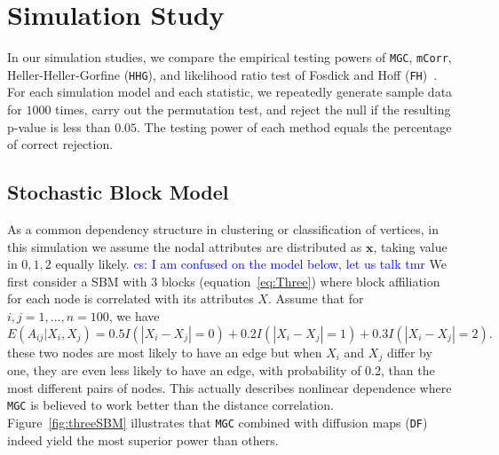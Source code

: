 \documentclass[11pt]{article}
\theoremstyle{definition}
\newcommand{\cs}[1]{\textcolor{blue}{cs: #1}}
\begin{document}
\section{Simulation Study}
\label{sec:simulation}
	\vspace*{-0.2cm}
In our simulation studies, we compare the empirical testing powers of \texttt{MGC}, \texttt{mCorr}, Heller-Heller-Gorfine (\texttt{HHG}), and likelihood ratio test of Fosdick and Hoff (\texttt{FH})~\citep{fosdick2015testing}. For each simulation model and each statistic, we repeatedly generate sample data for $1000$ times, carry out the permutation test, and reject the null if the resulting p-value is less than $0.05$. The testing power of each method equals the percentage of correct rejection. %

\subsection{Stochastic Block Model}

As a common dependency structure in clustering or classification of vertices, in this simulation we assume the nodal attributes are distributed as $\mathbf{x}$, taking value in $0,1,2$ equally likely.
\cs{I am confused on the model below, let us talk tmr}
We first consider a SBM with $3$ blocks (equation~\ref{eq:Three}) where block affiliation for each node is correlated with its attributes $X$. Assume that for $i,j = 1, \ldots , n = 100$, we have
\begin{equation}
\label{eq:Three}
E(A_{ij} | X_{i}, X_{j}) = 0.5 I(|X_{i} - X_{j}| = 0) + 0.2 I(|X_{i} - X_{j}| = 1) + 0.3 I(|X_{i} - X_{j}| = 2).
\end{equation}
these two nodes are most likely to have an edge but when $X_{i}$ and  $X_{j}$ differ by one, they are even less likely to have an edge, with probability of 0.2, than the most different pairs of nodes. This actually describes nonlinear dependence where \texttt{MGC} is believed to work better than the distance correlation. Figure~\ref{fig:threeSBM} illustrates that \texttt{MGC} combined with diffusion maps (\texttt{DF}) indeed yield the most superior power than others.
\end{document}
